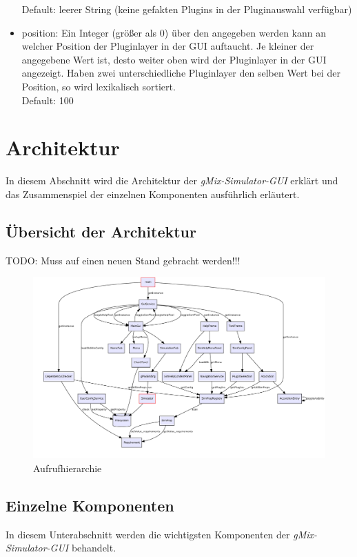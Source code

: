 \documentclass[a4paper, 11pt]{article} %
\begin{document}
\begin{itemize}
	Default: leerer String (keine gefakten Plugins in der Pluginauswahl verfügbar)
	\item position:
	Ein Integer (größer als 0) über den angegeben werden kann an welcher Position der Pluginlayer in der GUI auftaucht. Je kleiner der angegebene Wert ist, desto weiter oben wird der Pluginlayer in der GUI angezeigt. Haben zwei unterschiedliche Pluginlayer den selben Wert bei der Position, so wird lexikalisch sortiert.\\
	Default: 100 
\end{itemize}

\section{Architektur} %
\label{sec:architektur}
In diesem Abschnitt wird die Architektur der \emph{gMix-Simulator-GUI} erklärt und das Zusammenspiel der einzelnen Komponenten ausführlich erläutert. 

\subsection{Übersicht der Architektur} %
\label{ssub:uebersicht}

TODO: Muss auf einen neuen Stand gebracht werden!!!

\begin{figure}[!htp]
\includegraphics[width=\textwidth]{dot/arch}
\caption{Aufrufhierarchie}
\label{fig:callgraph}
\end{figure}


\subsection{Einzelne Komponenten} %
\label{ssub:einzelne_komponenten}
In diesem Unterabschnitt werden die wichtigsten Komponenten der \emph{gMix-Simulator-GUI} behandelt.
\end{document}

